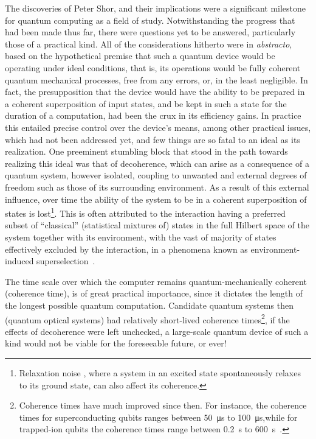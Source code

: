 \bigskip
\noindent
The discoveries of Peter Shor, and their implications were a significant milestone for quantum computing as a field of study. Notwithstanding the progress that had been made thus far, there were questions yet to be answered, particularly those of a practical kind. All of the considerations hitherto were in \emph{abstracto}, based on the hypothetical premise that such a quantum device would be operating under ideal conditions, that is, its operations would be fully coherent quantum mechanical processes, free from any errors, or, in the least negligible. In fact, the presupposition that the device would have the ability to be prepared in a coherent superposition of input states, and be kept in such a state for the duration of a computation, had been the crux in its efficiency gains. In practice this entailed precise control over the device's means, among other practical issues, which had not been addressed yet, and few things are so fatal to an ideal as its realization. One preeminent stumbling block that stood in the path towards realizing this ideal was that of decoherence, which can arise as a consequence of a quantum system, however isolated, coupling to unwanted and external degrees of freedom such as those of its surrounding environment. As a result of this external influence, over time the ability of the system to be in a coherent superposition of states is lost\footnote{Relaxation noise , where a system in an excited state spontaneously relaxes to its ground state, can also affect its coherence.}. This is often attributed to the interaction having a preferred subset of \enquote{classical} (statistical mixtures of) states in the full Hilbert space of the system together with its environment, with the vast of majority of states effectively excluded by the interaction, in a phenomena known as environment-induced superselection~\cite{Zurek_1991, Zurek_2003}. 


\clearpage
\noindent
The time scale over which the computer remains quantum-mechanically coherent (coherence time), is of great practical importance, since it dictates the length of the longest possible quantum computation. Candidate quantum systems then (\eg quantum optical systems) had relatively short-lived coherence times\footnote{Coherence times have much improved since then. For instance, the coherence times for superconducting qubits ranges between \SI{50}{\micro\second} to \SI{100}{\micro\second},while for trapped-ion qubits the coherence times range between \SI{0.2}{\second} to \SI{600}{\second}~\cite{Kjaergaard_2020,Bruzewicz_2019}.}, if the effects of decoherence were left unchecked, a large-scale quantum device of such a kind would not be viable for the foreseeable future, or ever!

